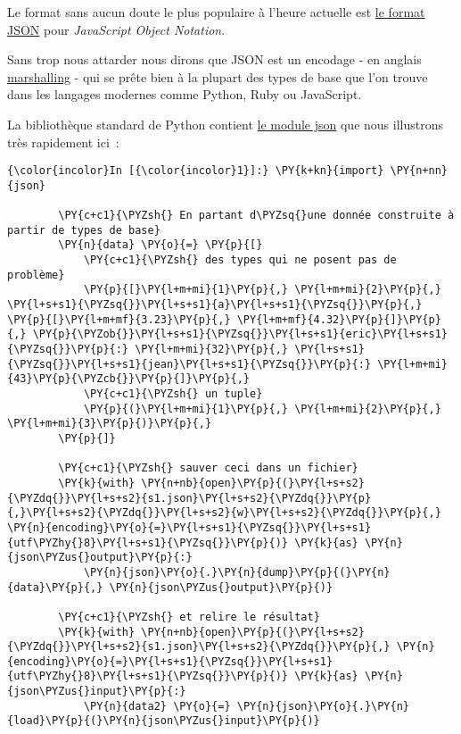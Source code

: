     Le format sans aucun doute le plus populaire à l'heure actuelle est
\href{http://fr.wikipedia.org/wiki/JavaScript_Object_Notation}{le format
JSON} pour \emph{JavaScript Object Notation}.

Sans trop nous attarder nous dirons que JSON est un encodage - en
anglais
\href{http://en.wikipedia.org/wiki/Marshalling_\%28computer_science\%29}{marshalling}
- qui se prête bien à la plupart des types de base que l'on trouve dans
les langages modernes comme Python, Ruby ou JavaScript.

La bibliothèque standard de Python contient
\href{https://docs.python.org/3/library/json.html}{le module json} que
nous illustrons très rapidement ici~:

    \begin{Verbatim}[commandchars=\\\{\}]
{\color{incolor}In [{\color{incolor}1}]:} \PY{k+kn}{import} \PY{n+nn}{json}
        
        \PY{c+c1}{\PYZsh{} En partant d\PYZsq{}une donnée construite à partir de types de base}
        \PY{n}{data} \PY{o}{=} \PY{p}{[}
            \PY{c+c1}{\PYZsh{} des types qui ne posent pas de problème}
            \PY{p}{[}\PY{l+m+mi}{1}\PY{p}{,} \PY{l+m+mi}{2}\PY{p}{,} \PY{l+s+s1}{\PYZsq{}}\PY{l+s+s1}{a}\PY{l+s+s1}{\PYZsq{}}\PY{p}{,} \PY{p}{[}\PY{l+m+mf}{3.23}\PY{p}{,} \PY{l+m+mf}{4.32}\PY{p}{]}\PY{p}{,} \PY{p}{\PYZob{}}\PY{l+s+s1}{\PYZsq{}}\PY{l+s+s1}{eric}\PY{l+s+s1}{\PYZsq{}}\PY{p}{:} \PY{l+m+mi}{32}\PY{p}{,} \PY{l+s+s1}{\PYZsq{}}\PY{l+s+s1}{jean}\PY{l+s+s1}{\PYZsq{}}\PY{p}{:} \PY{l+m+mi}{43}\PY{p}{\PYZcb{}}\PY{p}{]}\PY{p}{,}
            \PY{c+c1}{\PYZsh{} un tuple}
            \PY{p}{(}\PY{l+m+mi}{1}\PY{p}{,} \PY{l+m+mi}{2}\PY{p}{,} \PY{l+m+mi}{3}\PY{p}{)}\PY{p}{,}
        \PY{p}{]}
        
        \PY{c+c1}{\PYZsh{} sauver ceci dans un fichier}
        \PY{k}{with} \PY{n+nb}{open}\PY{p}{(}\PY{l+s+s2}{\PYZdq{}}\PY{l+s+s2}{s1.json}\PY{l+s+s2}{\PYZdq{}}\PY{p}{,}\PY{l+s+s2}{\PYZdq{}}\PY{l+s+s2}{w}\PY{l+s+s2}{\PYZdq{}}\PY{p}{,} \PY{n}{encoding}\PY{o}{=}\PY{l+s+s1}{\PYZsq{}}\PY{l+s+s1}{utf\PYZhy{}8}\PY{l+s+s1}{\PYZsq{}}\PY{p}{)} \PY{k}{as} \PY{n}{json\PYZus{}output}\PY{p}{:}
            \PY{n}{json}\PY{o}{.}\PY{n}{dump}\PY{p}{(}\PY{n}{data}\PY{p}{,} \PY{n}{json\PYZus{}output}\PY{p}{)}
        
        \PY{c+c1}{\PYZsh{} et relire le résultat}
        \PY{k}{with} \PY{n+nb}{open}\PY{p}{(}\PY{l+s+s2}{\PYZdq{}}\PY{l+s+s2}{s1.json}\PY{l+s+s2}{\PYZdq{}}\PY{p}{,} \PY{n}{encoding}\PY{o}{=}\PY{l+s+s1}{\PYZsq{}}\PY{l+s+s1}{utf\PYZhy{}8}\PY{l+s+s1}{\PYZsq{}}\PY{p}{)} \PY{k}{as} \PY{n}{json\PYZus{}input}\PY{p}{:}
            \PY{n}{data2} \PY{o}{=} \PY{n}{json}\PY{o}{.}\PY{n}{load}\PY{p}{(}\PY{n}{json\PYZus{}input}\PY{p}{)}
\end{Verbatim}


